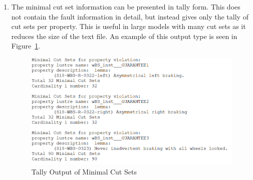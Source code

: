 \begin{enumerate}
\item The minimal cut set information can be presented in tally form. This does not contain the fault information in detail, but instead gives only the tally of cut sets per property. This is useful in large models with many cut sets as it reduces the size of the text file. An example of this output type is seen in Figure~\ref{fig:tallyMCS}.
\begin{figure}[htbp]
	\hspace*{-2cm}
	\vspace{-0.1in} 
	\begin{center}
		\includegraphics[scale=0.7]{images/wbsMCSTally.png}
	\caption{Tally Output of Minimal Cut Sets}
		\label{fig:tallyMCS}
	\end{center}
\end{figure}

\end{enumerate}

